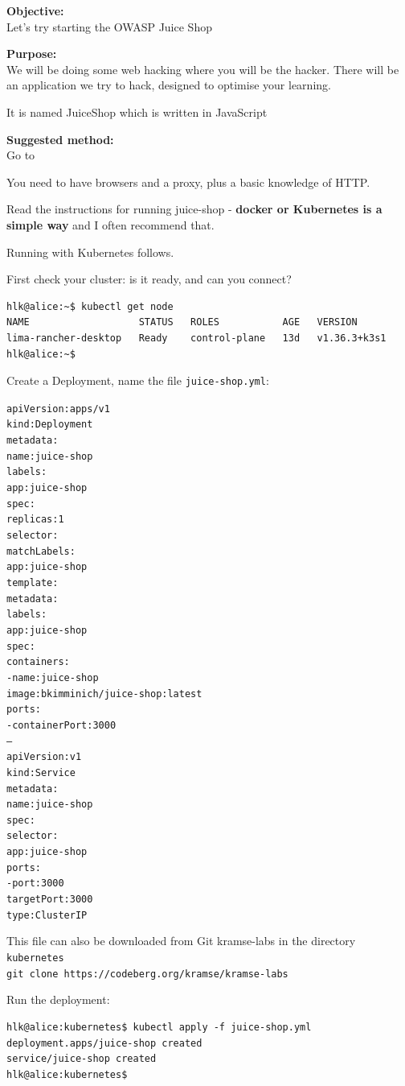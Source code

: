 \documentclass[a4paper,11pt,notitlepage]{report}
\begin{document}

{\bf Objective:}\\
Let's try starting the OWASP Juice Shop

{\bf Purpose:}\\
We will be doing some web hacking where you will be the hacker. There
will be an application we try to hack, designed to
optimise your learning.

It is named JuiceShop which is written in JavaScript

{\bf Suggested method:}\\
Go to 

You need to have browsers and a proxy, plus a basic knowledge of HTTP.

Read the instructions for running juice-shop - {\bf docker or Kubernetes is a simple way} and I often recommend that.

Running with Kubernetes follows.

First check your cluster: is it ready, and can you connect?
\begin{verbatim}
hlk@alice:~$ kubectl get node
NAME                   STATUS   ROLES           AGE   VERSION
lima-rancher-desktop   Ready    control-plane   13d   v1.36.3+k3s1
hlk@alice:~$
\end{verbatim}

\eject
Create a Deployment, name the file \verb+juice-shop.yml+:
\begin{alltt}
apiVersion: apps/v1
kind: Deployment
metadata:
  name: juice-shop
  labels:
    app: juice-shop
spec:
  replicas: 1
  selector:
    matchLabels:
      app: juice-shop
  template:
    metadata:
      labels:
        app: juice-shop
    spec:
      containers:
        - name: juice-shop
          image: bkimminich/juice-shop:latest
          ports:
            - containerPort: 3000
---
apiVersion: v1
kind: Service
metadata:
  name: juice-shop
spec:
  selector:
    app: juice-shop
  ports:
    - port: 3000
      targetPort: 3000
  type: ClusterIP
\end{alltt}

This file can also be downloaded from Git kramse-labs in the directory \verb+kubernetes+\\
\verb+git clone https://codeberg.org/kramse/kramse-labs+

Run the deployment:
\begin{verbatim}
hlk@alice:kubernetes$ kubectl apply -f juice-shop.yml
deployment.apps/juice-shop created
service/juice-shop created
hlk@alice:kubernetes$
\end{verbatim}
\end{document}

